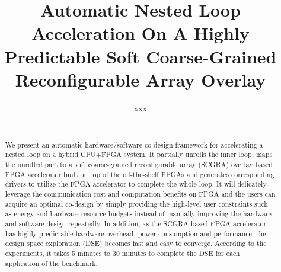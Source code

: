 \documentclass{acm_proc_article-sp}
\begin{document}
\title{Automatic Nested Loop Acceleration On A Highly Predictable Soft Coarse-Grained Reconfigurable Array Overlay}

 \author{
 \alignauthor
 xxx\\
 \\
 }

\maketitle

\begin{abstract}
We present an automatic hardware/software co-design framework for accelerating a nested loop on a 
hybrid CPU+FPGA system. It partially unrolls the inner loop, maps the unrolled part to a soft 
coarse-grained reconfigurable array (SCGRA) overlay based FPGA accelerator built on top of the 
off-the-shelf FPGAs and generates corresponding drivers to utilize the FPGA accelerator to complete
the whole loop. It will delicately leverage the communication cost and computation benefits on 
FPGA and the users can acquire an optimal co-design by simply providing the high-level 
user constraints such as energy and hardware resource budgets instead of 
manually improving the hardware and software design repeatedly. In addition, as the SCGRA based FPGA 
accelerator has highly predictable hardware overhead, power consumption and performance, the design 
space exploration (DSE) becomes fast and easy to converge. According to the experiments, it takes 5 
minutes to 30 minutes to complete the DSE for each application of the benchmark.

\end{abstract}
 
\end{document}
